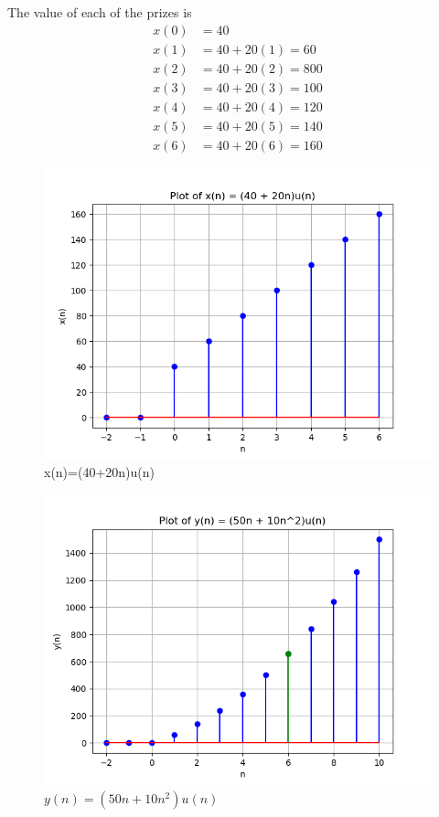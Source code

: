 \documentclass[journal,12pt,twocolumn]{IEEEtran}
\theoremstyle{remark}
\begin{document}
The value of each of the prizes is 
\begin{align}
    x(0) &= 40 \\
    x(1) &= 40 + 20(1) = 60 \\
    x(2) &= 40 + 20(2) = 800 \\
    x(3) &= 40 + 20(3) = 100 \\
    x(4) &= 40 + 20(4) = 120 \\
    x(5) &= 40 + 20(5) = 140 \\
    x(6) &= 40 + 20(6) = 160 
\end{align}

\begin{figure}[!h] 
\centering
\includegraphics[width=\columnwidth]{figs/term.png}
\caption{x(n)=(40+20n)u(n)}
\label{fig:term_graph}
\end{figure}

\begin{figure}[!h] 
    \centering
    \includegraphics[width=\columnwidth]{figs/Sum.png}
    \caption{$y(n)=(50n+10n^2 )u(n)$}
    \label{fig:sum_graph}
    \end{figure}
\end{document}
